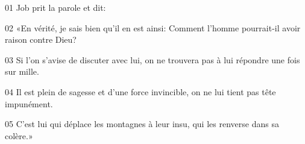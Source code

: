 01 Job prit la parole et dit:

02 «En vérité, je sais bien qu’il en est ainsi: Comment l’homme pourrait-il avoir raison contre Dieu?

03 Si l’on s’avise de discuter avec lui, on ne trouvera pas à lui répondre une fois sur mille.

04 Il est plein de sagesse et d’une force invincible, on ne lui tient pas tête impunément.

05 C’est lui qui déplace les montagnes à leur insu, qui les renverse dans sa colère.»
